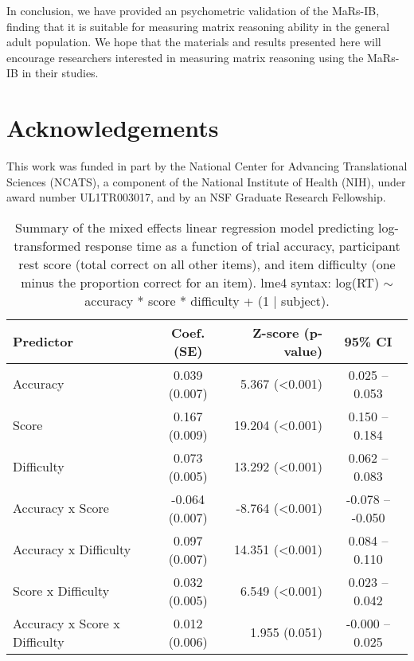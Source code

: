 \documentclass[a4paper,man,natbib]{apa6}
\begin{document}
In conclusion, we have provided an psychometric validation of the MaRs-IB, finding that it is suitable for measuring matrix reasoning ability in the general adult population. We hope that the materials and results presented here will encourage researchers interested in measuring matrix reasoning using the MaRs-IB in their studies. 

\section{Acknowledgements}
\noindent This work was funded in part by the National Center for Advancing Translational Sciences (NCATS), a component of the National Institute of Health (NIH), under award number UL1TR003017, and by an NSF Graduate Research Fellowship.



\begin{table}[]
\centering
\begin{tabular*}{\textwidth}{lc@{\hskip 6mm}r@{\hskip 6mm}c}
\toprule
Predictor &  Coef. (SE) & Z-score (p-value) & 95\% CI  \\
\midrule
Accuracy & 0.039 (0.007) &   5.367 (<0.001) &  0.025 -- 0.053  \\
Score &  0.167 (0.009) &  19.204 (<0.001) &  0.150 -- 0.184  \\
Difficulty & 0.073 (0.005) &  13.292 (<0.001) &  0.062 -- 0.083  \\
Accuracy x Score & -0.064 (0.007) &  -8.764 (<0.001) & -0.078 -- -0.050  \\
Accuracy x Difficulty & 0.097 (0.007) &  14.351 (<0.001) &  0.084 -- 0.110  \\
Score x Difficulty &  0.032 (0.005) &   6.549 (<0.001) &  0.023 -- 0.042  \\
Accuracy x Score x Difficulty &  0.012 (0.006) & 1.955 (0.051) & -0.000 -- 0.025  \\
\bottomrule
\end{tabular*}
\caption{\label{table:1}\normalfont Summary of the mixed effects linear regression model predicting log-transformed response time as a function of trial accuracy, participant rest score (total correct on all other items), and item difficulty (one minus the proportion correct for an item). \newline lme4 syntax: log(RT) $\sim$ accuracy * score * difficulty + (1 | subject).}
\end{table}
\end{document}
